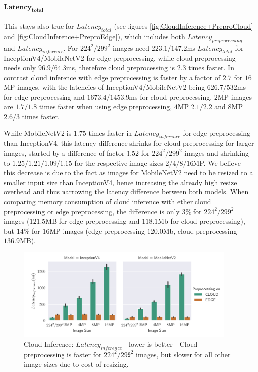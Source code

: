 \paragraph{$\mathbf{Latency_{total}}$}
This stays also true for $Latency_{total}$ (see figures \ref{fig:CloudInference+PreproCloud} and \ref{fig:CloudInference+PreproEdge}), which includes both $Latency_{preprocessing}$ and $Latency_{inference}$. 
For $224^2/299^2$ images need $223.1/147.2$ms $Latency_{total}$ for InceptionV4/MobileNetV2 for edge preprocessing, while cloud preprocessing needs only $96.9/64.3$ms, therefore cloud preprocessing is $2.3$ times faster.
In contrast cloud inference with edge preprocessing is faster by a factor of $2.7$ for $16$MP images, with the latencies of InceptionV4/MobileNetV2 being $626.7/532$ms for edge preprocessing and $1673.4/1453.9$ms for cloud preprocessing. $2$MP images are $1.7/1.8$ times faster when using edge preprocessing, $4$MP $2.1/2.2$ and $8$MP $2.6/3$ times faster.

While MobileNetV2 is $1.75$ times faster in $Latency_{inference}$ for edge preprocessing than InceptionV4, this latency difference shrinks for cloud preprocessing for larger images, started by a difference of factor $1.52$ for $224^2/299^2$ images and shrinking to $1.25/1.21/1.09/1.15$ for the respective image sizes $2/4/8/16$MP.
We believe this decrease is due to the fact as images for MobileNetV2 need to be resized to a smaller input size than InceptionV4, hence increasing the already high resize overhead and thus narrowing the latency difference between both models.
When comparing memory consumption of cloud inference with ether cloud preprocessing or edge preprocessing, the difference is only $3\%$ for  $224^2/299^2$ images ($121.5$MB for edge preprocessing and $118.1$Mb for cloud preprocessing), but $14\%$ for $16$MP images (edge preprocessing $120.0$Mb, cloud preprocessing $136.9$MB).

\begin{figure}[!htb]
\centering
\includegraphics[width=0.95\textwidth]{./Bilder/single_plots/cloud_inference_plots/Cloud_Inference_Latency.pdf}
\caption[Cloud Inference:  $Latency_{inference}$ - lower is better]{Cloud Inference:  $Latency_{inference}$ - lower is better - Cloud preprocessing is faster for $224^2/299^2$ images, but slower for all other image sizes due to cost of resizing.}
\label{fig:cloudInferenceInferenceLatency}
\end{figure}



